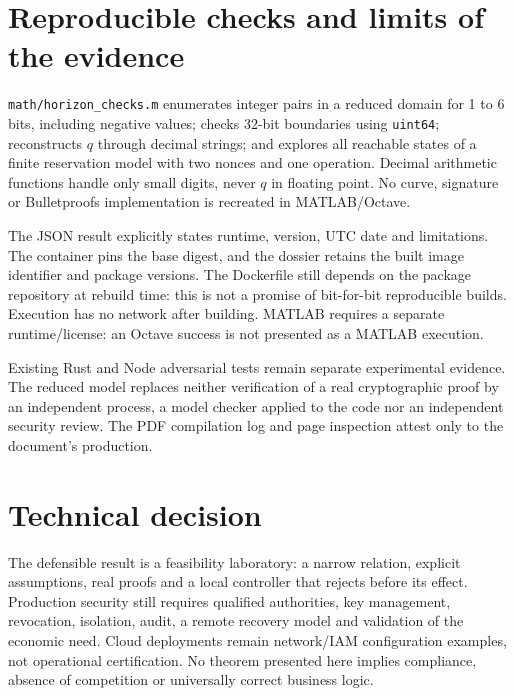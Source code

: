 \documentclass[11pt,a4paper]{article}
\newcommand{\code}[1]{\nolinkurl{#1}}
\begin{document}
\section{Reproducible checks and limits of the evidence}
\code{math/horizon_checks.m} enumerates integer pairs in a reduced domain
for 1 to 6 bits, including negative values; checks 32-bit boundaries using
\code{uint64}; reconstructs $q$ through decimal strings; and explores all
reachable states of a finite reservation model with two nonces and one
operation. Decimal arithmetic functions handle only small digits, never
$q$ in floating point. No curve, signature or Bulletproofs implementation
is recreated in MATLAB/Octave.

The JSON result explicitly states runtime, version, UTC date and limitations.
The container pins the base digest, and the dossier retains the built image
identifier and package versions. The Dockerfile still depends on the package
repository at rebuild time: this is not a promise of bit-for-bit reproducible
builds. Execution has no network after building. MATLAB requires a separate
runtime/license: an Octave success is not presented as a MATLAB execution.

Existing Rust and Node adversarial tests remain separate experimental evidence.
The reduced model replaces neither verification of a real cryptographic proof
by an independent process, a model checker applied to the code nor an independent
security review. The PDF compilation log and page inspection attest only to
the document's production.

\section{Technical decision}
The defensible result is a feasibility laboratory: a narrow relation, explicit
assumptions, real proofs and a local controller that rejects before its effect.
Production security still requires qualified authorities, key management,
revocation, isolation, audit, a remote recovery model and validation of the
economic need. Cloud deployments remain network/IAM configuration examples,
not operational certification. No theorem presented here implies compliance,
absence of competition or universally correct business logic.



\end{document}
